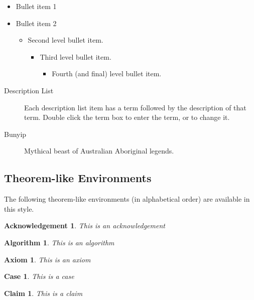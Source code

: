 \documentclass{article}
\newtheorem{acknowledgement}[theorem]{Acknowledgement}
\newtheorem{algorithm}[theorem]{Algorithm}
\newtheorem{axiom}[theorem]{Axiom}
\newtheorem{case}[theorem]{Case}
\newtheorem{claim}[theorem]{Claim}
\begin{document}
\begin{itemize}
\item Bullet item 1

\item Bullet item 2

\begin{itemize}
\item Second level bullet item.

\begin{itemize}
\item Third level bullet item.

\begin{itemize}
\item Fourth (and final) level bullet item.
\end{itemize}
\end{itemize}
\end{itemize}
\end{itemize}

\begin{description}
\item[Description List] Each description list item has a term followed by
the description of that term. Double click the term box to enter the term,
or to change it.

\item[Bunyip] Mythical beast of Australian Aboriginal legends.
\end{description}

\subsection{Theorem-like Environments}

The following theorem-like environments (in alphabetical order) are
available in this style.

\begin{acknowledgement}
This is an acknowledgement
\end{acknowledgement}

\begin{algorithm}
This is an algorithm
\end{algorithm}

\begin{axiom}
This is an axiom
\end{axiom}

\begin{case}
This is a case
\end{case}

\begin{claim}
This is a claim
\end{claim}
\end{document}
